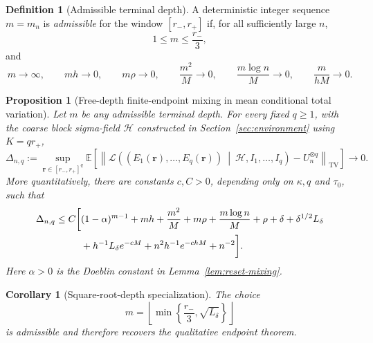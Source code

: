 \documentclass[11pt]{article}
\newcommand{\E}{\mathbb E}
\newcommand{\1}{\mathbf 1}
\newcommand{\TV}{\mathrm{TV}}
\newcommand{\cH}{\mathcal H}
\newcommand{\cL}{\mathcal L}
\newtheorem{proposition}[theorem]{Proposition}
\newtheorem{corollary}[theorem]{Corollary}
\theoremstyle{definition}
\newtheorem{definition}[theorem]{Definition}
\theoremstyle{remark}
\begin{document}
\begin{definition}[Admissible terminal depth]
\label{def:admissible-depth}
A deterministic integer sequence $m=m_n$ is \emph{admissible} for the
window $[r_-,r_+]$ if, for all sufficiently large $n$,
\begin{equation}\label{eq:m-window-general}
 1\le m\le \frac{r_-}{3},
\end{equation}
and
\begin{equation}\label{eq:m-admissible}
 m\longrightarrow\infty,
 \qquad mh\longrightarrow0,
 \qquad m\rho\longrightarrow0,
 \qquad \frac{m^2}{M}\longrightarrow0,
 \qquad \frac{m\log n}{M}\longrightarrow0,
 \qquad \frac{m}{hM}\longrightarrow0.
\end{equation}
\end{definition}

\begin{proposition}[Free-depth finite-endpoint mixing in mean conditional total variation]
\label{prop:endpoint-mixing}
Let $m$ be any admissible terminal depth.  For every fixed $q\geq1$, with
the coarse block sigma-field $\cH$ constructed in
Section~\ref{sec:environment} using $K=q r_+$,
\begin{equation}\label{eq:coarse-conditional-TV}
 \Delta_{n,q}:=
 \sup_{\mathbf r\in[r_-,r_+]^q}
 \E\left[
  \left\|
   \cL\left(
    (E_1(\mathbf r),\dots,E_q(\mathbf r))
    \ \middle|\ \cH,I_1,\dots,I_q
   \right)
   -U_n^{\otimes q}
  \right\|_{\TV}
 \right]
 \longrightarrow0.
\end{equation}
More quantitatively, there are constants $c,C>0$, depending only on
$\kappa,q$ and $\tau_0$, such that
\begin{align}
 \Delta_{n,q}\le C\bigg[&
 (1-\alpha)^{m-1}
 +mh+\frac{m^2}{M}
 +m\rho+\frac{m\log n}{M}
 +\rho+\delta+\delta^{1/2}L_\delta
 \notag\\
 &+h^{-1}L_\delta e^{-cM}
 +n^2h^{-1}e^{-chM}
 +n^{-2}
 \bigg].
 \label{eq:free-depth-global-bound}
\end{align}
Here $\alpha>0$ is the Doeblin constant in
Lemma~\ref{lem:reset-mixing}.
\end{proposition}

\begin{corollary}[Square-root-depth specialization]
\label{cor:sqrt-depth}
The choice
\begin{equation}\label{eq:m-window}
 m=\left\lfloor
 \min\left\{\frac{r_-}{3},\sqrt{L_\delta}\right\}
 \right\rfloor
\end{equation}
is admissible and therefore recovers the qualitative endpoint theorem.
\end{corollary}
\end{document}
